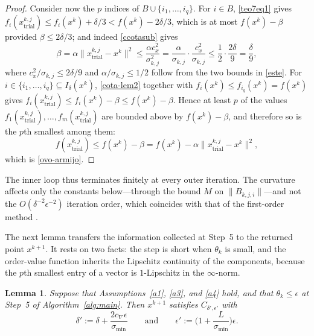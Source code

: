 \documentclass[11pt]{article}
\newcommand{\xkjtrial}{x^{k,j}_{\mathrm{trial}}}
\newtheorem{lemma}[theorem]{Lemma}
\newcounter{alg}[section]
\begin{document}
\begin{proof}
Consider now the $p$ indices of $B \cup \{i_1, \ldots, i_q\}$. For $i \in B$,
\eqref{teo7eq1} gives
$f_i(\xkjtrial) \leq f_i(x^k) + \delta/3 < f(x^k) - 2\delta/3$, which is at
most $f(x^k) - \beta$ provided $\beta \leq 2\delta/3$; and indeed
\eqref{ccotasub} gives
\[
\beta = \alpha \|\xkjtrial - x^k\|^2 \leq \frac{\alpha c_x^2}{\sigma_{k,j}^2}
= \frac{\alpha}{\sigma_{k,j}} \cdot \frac{c_x^2}{\sigma_{k,j}}
\leq \frac{1}{2} \cdot \frac{2\delta}{9} = \frac{\delta}{9},
\]
where $c_x^2/\sigma_{k,j} \leq 2\delta/9$ and $\alpha/\sigma_{k,j} \leq 1/2$
follow from the two bounds in \eqref{este}. For
$i \in \{i_1, \ldots, i_q\} \subseteq I_\delta(x^k)$, \eqref{cota-lem2} together
with $f_i(x^k) \leq f_{i_q}(x^k) = f(x^k)$ gives
$f_i(\xkjtrial) \leq f_i(x^k) - \beta \leq f(x^k) - \beta$. Hence at least $p$
of the values $f_1(\xkjtrial), \ldots, f_m(\xkjtrial)$ are bounded above by
$f(x^k) - \beta$, and therefore so is the $p$th smallest among them:
\[
f(\xkjtrial) \leq f(x^k) - \beta = f(x^k) - \alpha\|\xkjtrial - x^k\|^2,
\]
which is \eqref{ovo-armijo}.
\end{proof}

The inner loop thus terminates finitely at every outer iteration. The curvature
affects only the constants below---through the bound $M$ on
$\|B_{k,j,i}\|$---and not the $O(\delta^{-2}\epsilon^{-2})$ iteration order, which coincides with that
of the first-order method \cite{alvarezovo}.

The next lemma transfers the information collected at Step~5 to the returned
point $x^{k+1}$. It rests on two facts: the step is short when $\theta_k$ is
small, and the order-value function inherits the Lipschitz continuity of the
components, because the $p$th smallest entry of a vector is
$1$-Lipschitz in the $\infty$-norm.

\begin{lemma} \label{lem:transfer}
Suppose that Assumptions~\ref{a1}, \ref{a3}, and \ref{a4} hold, and that
$\theta_k \leq \epsilon$ at Step~5 of Algorithm~\ref{alg:main}. Then $x^{k+1}$
satisfies $C_{\delta',\epsilon'}$ with
\begin{equation} \label{transfer-const}
\delta' := \delta + \frac{2 c_\nabla \epsilon}{\sigma_{\min}}
\qquad \text{and} \qquad
\epsilon' := \Big( 1 + \frac{L}{\sigma_{\min}} \Big) \epsilon.
\end{equation}
\end{lemma}
\end{document}
